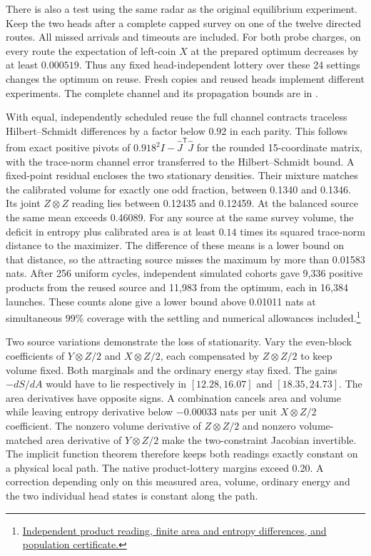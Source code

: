 \documentclass[11pt]{article}
\begin{document}
There is also a test using the same radar as the original equilibrium
experiment. Keep the two heads after a complete capped survey on one
of the twelve directed routes. All missed arrivals and timeouts are
included. For both probe charges, on every route the expectation of
left-coin $X$ at the prepared optimum decreases by at least $0.000519$.
Thus any fixed head-independent lottery over these 24 settings changes
the optimum on reuse. Fresh copies and reused heads implement different
experiments. The complete channel and its propagation bounds are in
.

With equal, independently scheduled reuse the full channel contracts
traceless Hilbert--Schmidt differences by a factor below $0.92$ in
each parity. This follows from exact positive pivots of
$0.918^2 I-\widehat J^{\mathsf T}\widehat J$ for the rounded
15-coordinate matrix, with the trace-norm channel error transferred
to the Hilbert--Schmidt bound. A fixed-point residual encloses the
two stationary densities. Their mixture matches the calibrated
volume for exactly one odd fraction, between 0.1340 and 0.1346.
Its joint $Z\otimes Z$ reading lies between 0.12435 and 0.12459.
At the balanced source the same mean exceeds 0.46089. For any source
at the same survey volume, the deficit in entropy plus calibrated
area is at least $0.14$ times its squared trace-norm distance to the
maximizer.
The difference of these means is a lower bound on that distance, so
the attracting source misses the maximum by more than 0.01583 nats.
After 256 uniform cycles, independent simulated cohorts gave 9,336
positive products from the reused source and 11,983 from the optimum,
each in 16,384 launches. These counts alone give a lower bound above
0.01011 nats at simultaneous $99\%$ coverage with the settling and
numerical allowances included.\footnote{\href{https://github.com/FloatingPragma/observer-patch-holography/tree/main/code/matched_einstein_limit/source_implication/full_algebra/reuse/selection_test}{Independent product reading, finite area and entropy differences, and population certificate.}}

Two source variations demonstrate the loss of stationarity.
Vary the even-block coefficients of $Y\otimes Z/2$ and $X\otimes Z/2$,
each compensated by $Z\otimes Z/2$ to keep volume fixed. Both
marginals and the ordinary energy stay fixed. The gains $-dS/dA$
would have to lie respectively in $[12.28,16.07]$ and $[18.35,24.73]$.
The area derivatives have opposite signs. A combination cancels area
and volume while leaving entropy derivative below $-0.00033$ nats per
unit $X\otimes Z/2$ coefficient. The nonzero volume derivative of
$Z\otimes Z/2$ and nonzero volume-matched area derivative of
$Y\otimes Z/2$ make the two-constraint Jacobian invertible. The
implicit function theorem therefore keeps both readings exactly
constant on a physical local path. The native product-lottery
margins exceed 0.20. A correction depending only on this measured
area, volume, ordinary energy and the two individual head states
is constant along the path.
\end{document}
